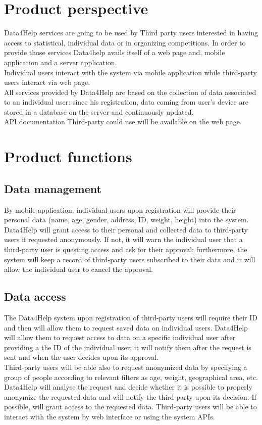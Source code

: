 \section{Product perspective}
Data4Help services are going to be used by Third party users interested in having access to statistical, individual data or in organizing competitions. In order to provide those services Data4help avails itself of a web page and, mobile application and a server application.  \\
Individual users interact with the system via mobile application while third-party users interact via web page. \\
All services provided by Data4Help are based on the collection of data associated to an individual user: since his registration, data coming from user’s device are stored in a database on the server and continuously updated. \\
API documentation Third-party could use will be available on the web page. \\

\section{Product functions}
\subsection{Data management}
By mobile application, individual users upon registration will provide their personal data (name, age, gender, address, ID, weight, height) into the system. Data4Help will grant access to their personal and collected data to third-party users if requested anonymously. If not, it will warn the individual user that a third-party user is questing access and ask for their approval; furthermore, the system will keep a record of third-party users subscribed to their data and it will allow the individual user to cancel the approval.
\subsection{Data access}
The Data4Help system upon registration of third-party users will require their ID and then will allow them to request saved data on individual users. Data4Help will allow them to request access to data on a specific individual user after providing a the ID of the individual user; it will notify them after the request is sent and when the user decides upon its approval. \\
Third-party users will be able also to request anonymized data by specifying a group of people according to relevant filters as age, weight, geographical area, etc. 
Data4Help will analyse the request and decide whether it is possible to properly anonymize the requested data and will notify the third-party upon its decision. If possible, will grant access to the requested data. Third-party users will be able to interact with the system by web interface or using the system APIs.
